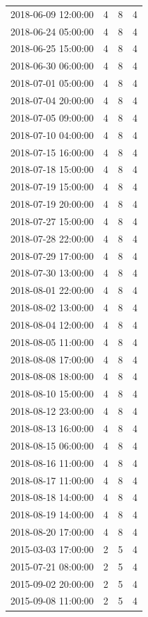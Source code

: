 \begin{tabular}{lrrr}
2018-06-09 12:00:00 & 4 & 8 & 4 \\
2018-06-24 05:00:00 & 4 & 8 & 4 \\
2018-06-25 15:00:00 & 4 & 8 & 4 \\
2018-06-30 06:00:00 & 4 & 8 & 4 \\
2018-07-01 05:00:00 & 4 & 8 & 4 \\
2018-07-04 20:00:00 & 4 & 8 & 4 \\
2018-07-05 09:00:00 & 4 & 8 & 4 \\
2018-07-10 04:00:00 & 4 & 8 & 4 \\
2018-07-15 16:00:00 & 4 & 8 & 4 \\
2018-07-18 15:00:00 & 4 & 8 & 4 \\
2018-07-19 15:00:00 & 4 & 8 & 4 \\
2018-07-19 20:00:00 & 4 & 8 & 4 \\
2018-07-27 15:00:00 & 4 & 8 & 4 \\
2018-07-28 22:00:00 & 4 & 8 & 4 \\
2018-07-29 17:00:00 & 4 & 8 & 4 \\
2018-07-30 13:00:00 & 4 & 8 & 4 \\
2018-08-01 22:00:00 & 4 & 8 & 4 \\
2018-08-02 13:00:00 & 4 & 8 & 4 \\
2018-08-04 12:00:00 & 4 & 8 & 4 \\
2018-08-05 11:00:00 & 4 & 8 & 4 \\
2018-08-08 17:00:00 & 4 & 8 & 4 \\
2018-08-08 18:00:00 & 4 & 8 & 4 \\
2018-08-10 15:00:00 & 4 & 8 & 4 \\
2018-08-12 23:00:00 & 4 & 8 & 4 \\
2018-08-13 16:00:00 & 4 & 8 & 4 \\
2018-08-15 06:00:00 & 4 & 8 & 4 \\
2018-08-16 11:00:00 & 4 & 8 & 4 \\
2018-08-17 11:00:00 & 4 & 8 & 4 \\
2018-08-18 14:00:00 & 4 & 8 & 4 \\
2018-08-19 14:00:00 & 4 & 8 & 4 \\
2018-08-20 17:00:00 & 4 & 8 & 4 \\
2015-03-03 17:00:00 & 2 & 5 & 4 \\
2015-07-21 08:00:00 & 2 & 5 & 4 \\
2015-09-02 20:00:00 & 2 & 5 & 4 \\
2015-09-08 11:00:00 & 2 & 5 & 4 \\

\end{tabular}
